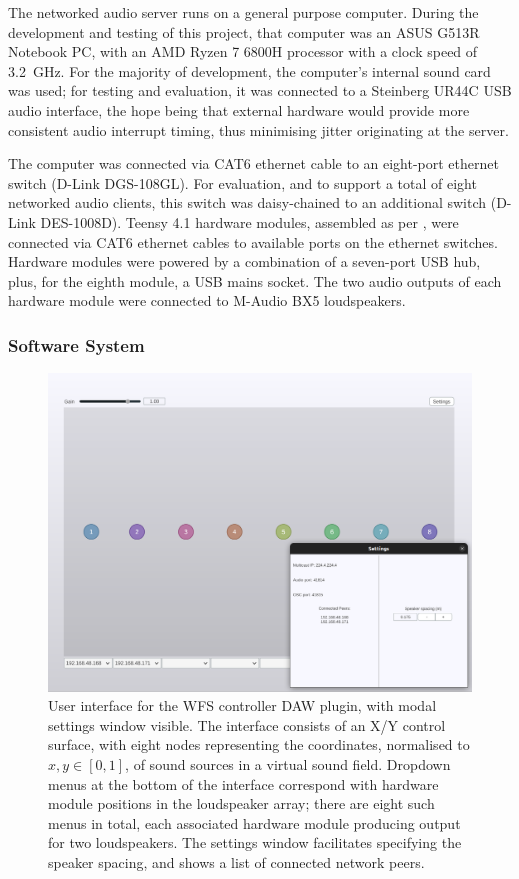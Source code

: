 The networked audio server runs on a general purpose computer.
During the development and testing of this project, that computer was an ASUS
G513R Notebook PC, with an AMD Ryzen 7 6800H processor with a clock
speed of \qty{3.2}{\GHz}.
For the majority of development, the computer's internal sound card was used;
for testing and evaluation, it was connected to a Steinberg UR44C USB audio
interface, the hope being that external hardware would provide more consistent
audio interrupt timing, thus minimising jitter originating at the server.

The computer was connected via CAT6 ethernet cable to an eight-port ethernet
switch (D-Link DGS-108GL).
For evaluation, and to support a total of eight networked audio clients, this
switch was daisy-chained to an additional switch (D-Link DES-1008D).
Teensy 4.1 hardware modules, assembled as per , were
connected via CAT6 ethernet cables to available ports on the ethernet switches.
Hardware modules were powered by a combination of a seven-port USB hub, plus,
for the eighth module, a USB mains socket.
The two audio outputs of each hardware module were connected to M-Audio BX5
loudspeakers.

\subsubsection{Software System}\label{subsubsec:software-system}

\begin{figure}[ht]
    \centering
    \includegraphics[width=\textwidth]{figures/plugin}
    \caption{
        User interface for the WFS controller DAW plugin, with modal
        settings window visible.
        The interface consists of an X/Y control surface, with eight nodes
        representing the coordinates, normalised to $x,y \in [0,1]$, of sound
        sources in a virtual sound field.
        Dropdown menus at the bottom of the interface correspond with hardware
        module positions in the loudspeaker array; there are eight such menus
        in total, each associated hardware module producing output for two
        loudspeakers.
        The settings window facilitates specifying the speaker spacing, and
        shows a list of connected network peers.
    }
    \label{fig:plugin-interface}
\end{figure}

